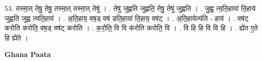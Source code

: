 \documentclass[17pt]{extarticle}
\begin{document}
53. तस्मा॒त् तेषु॒ तेषु॒ तस्मा॒त् तस्मा॒त् तेषु॑ । . तेषु॑ जुह्वति जुह्वति॒ तेषु॒ तेषु॑ जुह्वति । . जु॒ह्व॒ त्य॒ति॒हाया॑ ति॒हाय॑ जुह्वति जुह्व त्यति॒हाय॑ । . अ॒ति॒हाय॒ वष॒ड् वष॑ डति॒हाया॑ ति॒हाय॒ वष॑ट् । . अ॒ति॒हायेत्य॑ति - हाय॑ । . वष॑ट् करोति करोति॒ वष॒ड् वष॑ट् करोति । . क॒रो॒ति॒ वि वि क॑रोति करोति॒ वि । . वि हि हि वि वि हि । . ह्ये॑त ए॒ते हि ह्ये॑ते । \newline

\textbf{Ghana Paata } \newline
\end{document}
